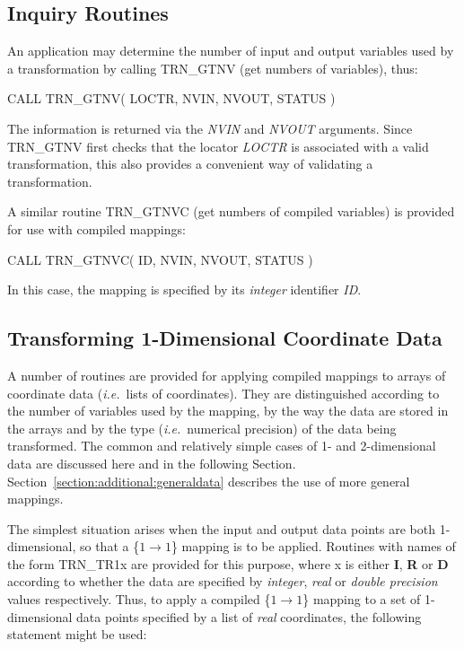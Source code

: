 \documentclass[twoside,nolof,11pt]{starlink}
\providecommand{\name}[1]{\small{#1}}
\providecommand{\fortvar}[1]{\emph{#1}}
\begin{document}
\subsection{Inquiry Routines}

An application may determine the number of input and output variables
used by a transformation by calling \name{TRN\_GTNV} (get numbers of
variables), thus:

\begin{terminalv}
CALL TRN_GTNV( LOCTR, NVIN, NVOUT, STATUS )
\end{terminalv}

The information is returned via the \fortvar{NVIN} and \fortvar{NVOUT}
arguments.
Since \name{TRN\_GTNV} first checks that the locator \fortvar{LOCTR} is
associated with a valid transformation, this also provides a convenient way
of validating a transformation.

A similar routine \name{TRN\_GTNVC} (get numbers of compiled variables) is
provided for use with compiled mappings:

\begin{terminalv}
CALL TRN_GTNVC( ID, NVIN, NVOUT, STATUS )
\end{terminalv}

In this case, the mapping is specified by its \emph{integer} identifier
\fortvar{ID}.


\subsection{Transforming 1-Dimensional Coordinate Data}

\label{section:simple:1ddata}

A number of routines are provided for applying compiled mappings to arrays
of coordinate data (\emph{i.e.}\ lists of coordinates).
They are distinguished according to the number of variables used by the
mapping, by the way the data are stored in the arrays and by the type
(\emph{i.e.}\ numerical precision) of the data being transformed.
The common and relatively simple cases of 1- and 2-dimensional data are
discussed here and in the following Section.
Section~\ref{section:additional:generaldata} describes the use of more
general mappings.

The simplest situation arises when the input and output data points are
both 1-dimensional, so that a \mbox{\{$1 \rightarrow 1$\}} mapping is
to be applied.  Routines with names of the form \name{TRN\_TR1x} are
provided for this purpose, where x is either \textbf{I}, \textbf{R} or
\textbf{D} according to whether the data are specified by
\emph{integer}, \emph{real} or \emph{double precision} values
respectively.  Thus, to apply a compiled \mbox{\{$1 \rightarrow 1$\}}
mapping to a set of 1-dimensional data points specified by a list of
\emph{real} coordinates, the following statement might be used:
\end{document}
